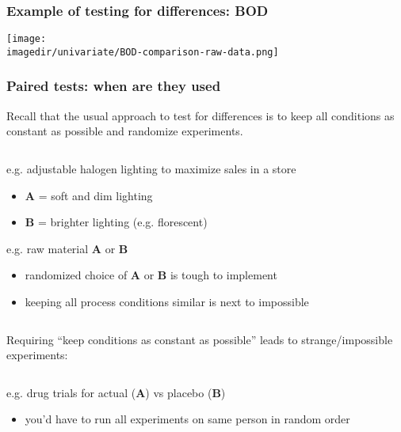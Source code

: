 \begin{frame}\frametitle{Example of testing for differences: BOD}
	\begin{center}
		\texttt{[image: \\imagedir/univariate/BOD-comparison-raw-data.png]}
	\end{center}
\end{frame}

\begin{frame}\frametitle{Paired tests: when are they used}

	Recall that the usual approach to test for differences is to keep all conditions as constant as possible and randomize experiments.

	$\quad$

	e.g. adjustable halogen lighting to maximize sales in a store
	\begin{itemize}
		\item	\textbf{A} = soft and dim lighting
		\item	\textbf{B} = brighter lighting (e.g. florescent)
	\end{itemize}

	e.g. raw material \textbf{A} or \textbf{B}
	\begin{itemize}
		\item	randomized choice of \textbf{A} or \textbf{B} is tough to implement
		\item	keeping all process conditions similar is next to impossible
	\end{itemize}

	$\quad$

	Requiring ``keep conditions as constant as possible'' leads to strange/impossible experiments:

	$\quad$

	e.g. drug trials for actual (\textbf{A}) vs placebo (\textbf{B})
	\begin{itemize}
		\item	you'd have to run all experiments on same person in random order
	\end{itemize}
\end{frame}

